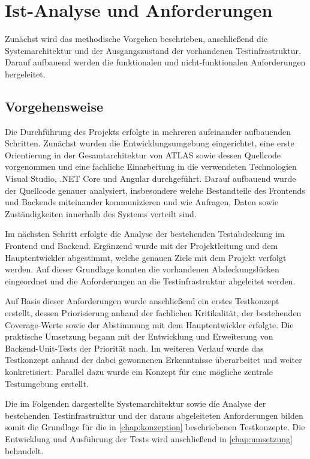 
\chapter{Ist-Analyse und Anforderungen}
\label{chap:ist-analyse-anforderungen}
Zunächst wird das methodische Vorgehen beschrieben, anschließend die Systemarchitektur und der Ausgangszustand der vorhandenen Testinfrastruktur. Darauf aufbauend werden die funktionalen und nicht-funktionalen Anforderungen hergeleitet.

\section{Vorgehensweise}
Die Durchführung des Projekts erfolgte in mehreren aufeinander aufbauenden Schritten. Zunächst wurden die Entwicklungsumgebung eingerichtet, eine erste Orientierung in der Gesamtarchitektur von \ac{ATLAS} sowie dessen Quellcode vorgenommen und eine fachliche Einarbeitung in die verwendeten Technologien Visual Studio, .NET Core und Angular durchgeführt. Darauf aufbauend wurde der Quellcode genauer analysiert, insbesondere welche Bestandteile des Frontends und Backends miteinander kommunizieren und wie Anfragen, Daten sowie Zuständigkeiten innerhalb des Systems verteilt sind.

Im nächsten Schritt erfolgte die Analyse der bestehenden Testabdeckung im Frontend und Backend. Ergänzend wurde mit der Projektleitung und dem Hauptentwickler abgestimmt, welche genauen Ziele mit dem Projekt verfolgt werden. Auf dieser Grundlage konnten die vorhandenen Abdeckungslücken eingeordnet und die Anforderungen an die Testinfrastruktur abgeleitet werden.

Auf Basis dieser Anforderungen wurde anschließend ein erstes Testkonzept erstellt, dessen Priorisierung anhand der fachlichen Kritikalität, der bestehenden Coverage-Werte sowie der Abstimmung mit dem Hauptentwickler erfolgte. Die praktische Umsetzung begann mit der Entwicklung und Erweiterung von Backend-Unit-Tests der Priorität nach. Im weiteren Verlauf wurde das Testkonzept anhand der dabei gewonnenen Erkenntnisse überarbeitet und weiter konkretisiert. Parallel dazu wurde ein Konzept für eine mögliche zentrale Testumgebung erstellt.

Die im Folgenden dargestellte Systemarchitektur sowie die Analyse der bestehenden Testinfrastruktur und der daraus abgeleiteten Anforderungen bilden somit die Grundlage für die in \autoref{chap:konzeption} beschriebenen Testkonzepte. Die Entwicklung und Ausführung der Tests wird anschließend in \autoref{chap:umsetzung} behandelt.


